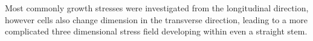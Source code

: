 Most commonly growth stresses were investigated from the longitudinal direction,
however cells also change dimension in the transverse direction, leading to a
more complicated three dimensional stress field developing within even a
straight stem.